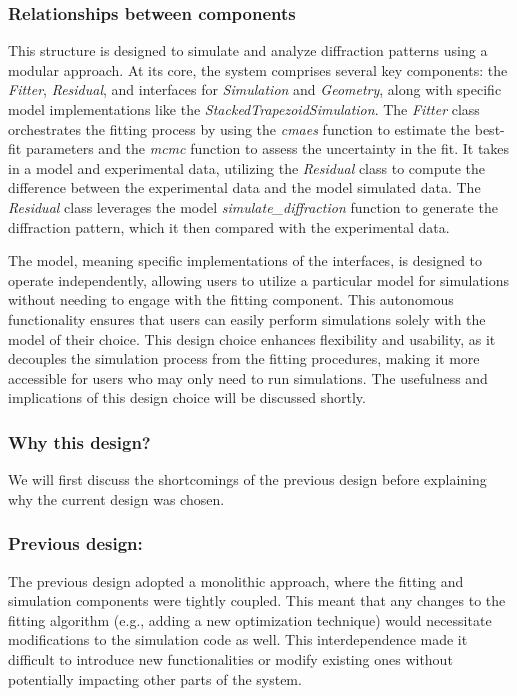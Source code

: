 \subsubsection{Relationships between components}

\medskip

This structure is designed to simulate and analyze diffraction patterns using
a modular approach. At its core, the system comprises several key components:
the \textit{Fitter}, \textit{Residual}, and interfaces for \textit{Simulation}
and \textit{Geometry}, along with specific model implementations like the
\textit{StackedTrapezoidSimulation}. The \textit{Fitter} class orchestrates
the fitting process by using the \textit{cmaes} function to estimate the best-fit parameters and
the \textit{mcmc} function to assess the uncertainty in the fit. It takes in a model and
experimental data, utilizing the \textit{Residual} class to compute the difference between
the experimental data and the model simulated data. The \textit{Residual} class leverages
the model \textit{simulate\_diffraction} function to generate the diffraction pattern,
which it then compared with the experimental data.

\medskip

The model, meaning specific implementations of the interfaces, is designed to operate 
independently, allowing users to utilize a particular model
for simulations without needing to engage with the fitting component. This autonomous 
functionality ensures that users can easily perform simulations solely with the model of
 their choice. This design choice enhances flexibility and usability, as it decouples the simulation process from the fitting procedures, making it more accessible for users who may only need to run simulations.
The usefulness and implications of this design choice will be discussed shortly.


\subsubsection{Why this design?}
We will first discuss the shortcomings of the previous design before explaining why the current design was chosen.

\subsubsection*{Previous design:}

The previous design adopted a monolithic approach, where the fitting and simulation components were tightly coupled. This meant that any changes to the fitting algorithm (e.g., adding a new optimization technique) would necessitate modifications to the simulation code as well. This interdependence made it difficult to introduce new functionalities or modify existing ones without potentially impacting other parts of the system.

